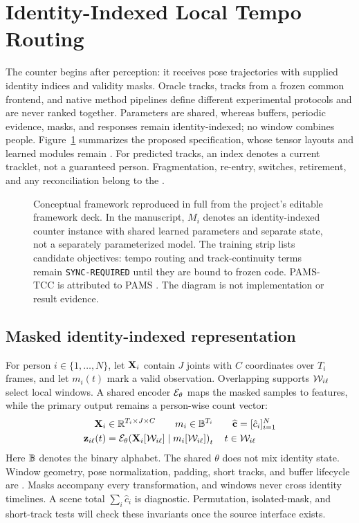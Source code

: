 \section{Identity-Indexed Local Tempo Routing}
\label{sec:method}

The counter begins after perception: it receives pose trajectories with supplied
identity indices and validity masks. Oracle tracks, tracks from a frozen common
frontend, and native method pipelines define different experimental protocols
and are never ranked together. Parameters are shared, whereas buffers, periodic
evidence, masks, and responses remain identity-indexed; no window combines
people. Figure~\ref{fig:framework} summarizes the proposed specification, whose
tensor layouts and learned modules remain . For predicted tracks, an index denotes a current tracklet, not a
guaranteed person. Fragmentation, re-entry, switches, retirement, and any
reconciliation belong to the .

\begin{figure}[t]
  \centering
  \TempoRACFrameworkGraphic
  \caption{Conceptual framework reproduced in full from the project's editable
  framework deck. In the manuscript, $M_i$ denotes an identity-indexed counter
  instance with shared learned parameters and separate state, not a separately
  parameterized model. The training strip lists candidate objectives: tempo
  routing and track-continuity terms remain \texttt{SYNC-REQUIRED} until they
  are bound to frozen code. PAMS-TCC is attributed to PAMS
  \cite{gao2026pams}. The diagram is not implementation or result evidence.}
  \label{fig:framework}
\end{figure}

\subsection{Masked identity-indexed representation}
For person $i\in\{1,\ldots,N\}$, let \(\mathbf{X}_i\) contain $J$ joints with $C$
coordinates over $T_i$ frames, and let $m_i(t)$ mark a valid observation.
Overlapping supports \(\mathcal{W}_{i\ell}\) select local windows. A shared encoder
\(\mathcal{E}_\theta\) maps the masked samples to features, while the primary output
remains a person-wise count vector:
\begin{equation}
\begin{aligned}
 \mathbf{X}_i &\in \mathbb{R}^{T_i\times J\times C}\qquad
 m_i\in\mathbb{B}^{T_i}\qquad
 \widehat{\mathbf{c}}=[\hat c_i]_{i=1}^{N} \\
 \mathbf{z}_{i\ell}(t) &=
 \mathcal{E}_\theta\!\left(\mathbf{X}_i[\mathcal{W}_{i\ell}]\mid m_i[\mathcal{W}_{i\ell}]\right)_t
 \quad t\in\mathcal{W}_{i\ell}
\end{aligned}
\label{eq:representation}
\end{equation}
\noindent Here $\mathbb{B}$ denotes the binary alphabet. The shared $\theta$ does
not mix identity state. Window geometry, pose
normalization, padding, short tracks, and buffer lifecycle are
. Masks accompany every
transformation, and windows never cross identity timelines. A scene total
$\sum_i\hat c_i$ is diagnostic. Permutation, isolated-mask, and short-track
tests will check these invariants once the source interface exists.

